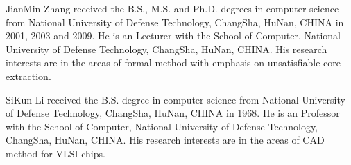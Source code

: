 \documentclass[journal]{IEEEtran}
\begin{document}
\begin{IEEEbiographynophoto}{JianMin Zhang}
received the B.S., M.S.
and Ph.D. degrees in computer science from
National University of Defense Technology, ChangSha, HuNan, CHINA in 2001, 2003 and 2009.
He is an Lecturer with the School of Computer,
National University of Defense Technology, ChangSha, HuNan, CHINA.
His research
interests are in the areas of formal method with emphasis on unsatisfiable core extraction.
\end{IEEEbiographynophoto}

\begin{IEEEbiography}{SiKun Li}
received the B.S. degree in computer science from
National University of Defense Technology, ChangSha, HuNan, CHINA in 1968.
He is an Professor with the School of Computer,
National University of Defense Technology, ChangSha, HuNan, CHINA.
His research
interests are in the areas of CAD method for VLSI chips.
\end{IEEEbiography}






%




\end{document}
